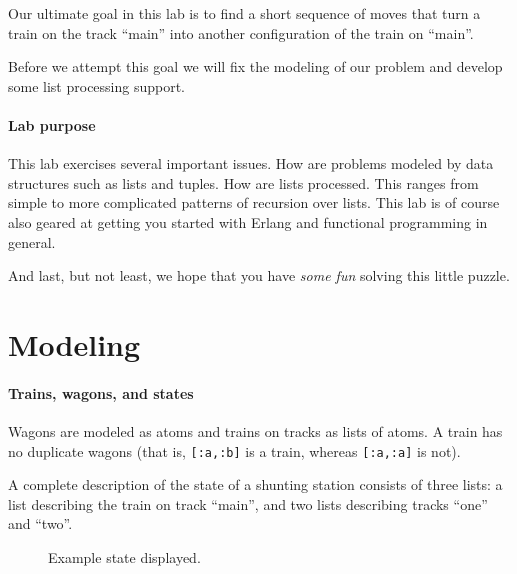 \documentclass[a4paper,11pt]{article}
\begin{document}
Our ultimate goal in this lab is to find a short sequence
of moves that turn a train on the track ``main'' into another
configuration of the train on ``main''.


Before we attempt this goal we will fix the modeling of our
problem and develop some list processing support.

\paragraph{Lab purpose}

This lab exercises several important issues. How are problems modeled
by data structures such as lists and tuples. How are lists
processed. This ranges from simple to more complicated patterns of
recursion over lists. This lab is of course also geared at getting you
started with Erlang and functional programming in general.

And last, but not least, we hope that you have \emph{some fun} solving
this little puzzle.

\section*{Modeling}

\paragraph{Trains, wagons, and states}

Wagons are modeled as atoms and trains on tracks as lists of atoms. A
train has no duplicate wagons (that is, \verb+[:a,:b]+ is a train,
whereas \verb+[:a,:a]+ is not).

A complete description of the state of a shunting station
consists of three lists: a list describing the train on track
``main'', and two lists describing tracks ``one'' and ``two''.

\begin{figure}[h]
\begin{center}
\end{center}
\caption{Example state displayed.}
\label{fig:ex-state}
\end{figure}
\end{document}

